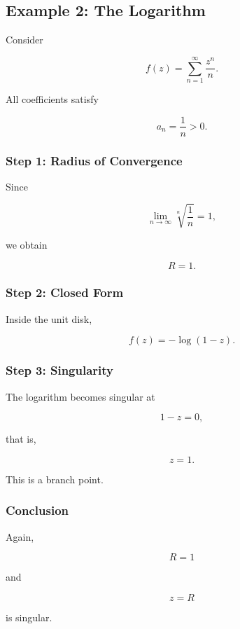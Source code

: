 \documentclass[12pt,a4paper]{article}
\theoremstyle{notespace}
\begin{document}
\bigskip

\subsection{Example 2: The Logarithm}

Consider

\[
f(z)=
\sum_{n=1}^{\infty}
\frac{z^n}{n}.
\]

All coefficients satisfy

\[
a_n=\frac1n>0.
\]

\subsubsection*{Step 1: Radius of Convergence}

Since

\[
\lim_{n\to\infty}\sqrt[n]{\frac1n}=1,
\]

we obtain

\[
R=1.
\]

\subsubsection*{Step 2: Closed Form}

Inside the unit disk,

\[
f(z)= -\log(1-z).
\]

\subsubsection*{Step 3: Singularity}

The logarithm becomes singular at

\[
1-z=0,
\]

that is,

\[
z=1.
\]

This is a branch point.

\subsubsection*{Conclusion}

Again,

\[
R=1
\]

and

\[
z=R
\]

is singular.

\begin{center}
\end{center}
\end{document}
